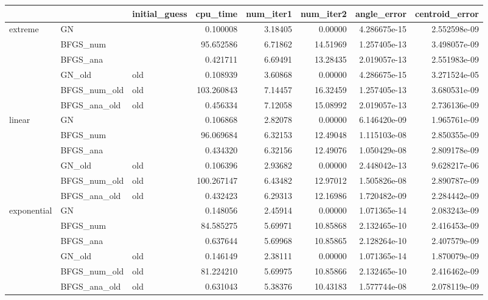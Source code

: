 \begin{tabular}{lllrrrrr}
\toprule
            &              & initial\_guess &    cpu\_time &  num\_iter1 &  num\_iter2 &   angle\_error &  centroid\_error \\
\midrule
extreme & GN &               &    0.100008 &    3.18405 &    0.00000 &  4.286675e-15 &    2.552598e-09 \\
            & BFGS\_num &               &   95.652586 &    6.71862 &   14.51969 &  1.257405e-13 &    3.498057e-09 \\
            & BFGS\_ana &               &    0.421711 &    6.69491 &   13.28435 &  2.019057e-13 &    2.551983e-09 \\
            & GN\_old &           old &    0.108939 &    3.60868 &    0.00000 &  4.286675e-15 &    3.271524e-05 \\
            & BFGS\_num\_old &           old &  103.260843 &    7.14457 &   16.32459 &  1.257405e-13 &    3.680531e-09 \\
            & BFGS\_ana\_old &           old &    0.456334 &    7.12058 &   15.08992 &  2.019057e-13 &    2.736136e-09 \\
linear & GN &               &    0.106868 &    2.82078 &    0.00000 &  6.146420e-09 &    1.965761e-09 \\
            & BFGS\_num &               &   96.069684 &    6.32153 &   12.49048 &  1.115103e-08 &    2.850355e-09 \\
            & BFGS\_ana &               &    0.434320 &    6.32156 &   12.49076 &  1.050429e-08 &    2.809178e-09 \\
            & GN\_old &           old &    0.106396 &    2.93682 &    0.00000 &  2.448042e-13 &    9.628217e-06 \\
            & BFGS\_num\_old &           old &  100.267147 &    6.43482 &   12.97012 &  1.505826e-08 &    2.890787e-09 \\
            & BFGS\_ana\_old &           old &    0.432423 &    6.29313 &   12.16986 &  1.720482e-09 &    2.284442e-09 \\
exponential & GN &               &    0.148056 &    2.45914 &    0.00000 &  1.071365e-14 &    2.083243e-09 \\
            & BFGS\_num &               &   84.585275 &    5.69971 &   10.85868 &  2.132465e-10 &    2.416453e-09 \\
            & BFGS\_ana &               &    0.637644 &    5.69968 &   10.85865 &  2.128264e-10 &    2.407579e-09 \\
            & GN\_old &           old &    0.146149 &    2.38111 &    0.00000 &  1.071365e-14 &    1.870079e-09 \\
            & BFGS\_num\_old &           old &   81.224210 &    5.69975 &   10.85866 &  2.132465e-10 &    2.416462e-09 \\
            & BFGS\_ana\_old &           old &    0.631043 &    5.38376 &   10.43183 &  1.577744e-08 &    2.078119e-09 \\
\bottomrule
\end{tabular}
